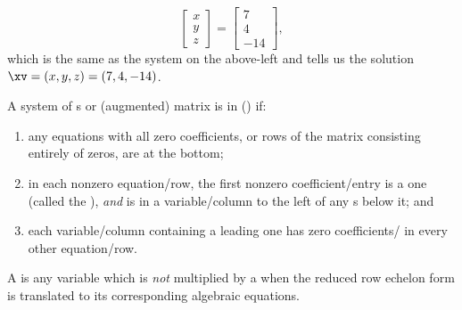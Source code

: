 \begin{example}
\begin{solution}
\begin{equation*}
\begin{bmatrix} x\\y\\z \end{bmatrix}
=\begin{bmatrix} 7\\4\\-14 \end{bmatrix},
\end{equation*}
which is the same as the system on the above-left and tells us the solution \(\xv=(x,y,z)=(7,4,-14)\).
\end{solution}
\end{example}





\begin{definition} \label{def:rref} 
 A system of s or (augmented) matrix is in  (\rref) if:
  \begin{enumerate}
\item any equations with all zero coefficients, or rows of the matrix consisting entirely of zeros, are at the bottom; 
\item in each nonzero equation\slash row, the first nonzero coefficient\slash entry is a one (called the ), \emph{and} is in a variable\slash column to the left of any s below it;
and
\item each variable\slash column containing a leading one has zero coefficients\slash {} in every other equation\slash row.\end{enumerate}
A  is any variable which is \emph{not} multiplied by a  when the reduced row echelon form is translated to its corresponding algebraic equations.
\end{definition}


